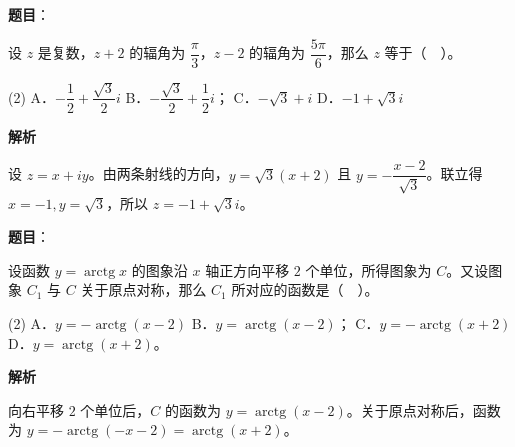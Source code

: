 \begin{answer}

\textbf{题目}：

设 $z$ 是复数，$z+2$ 的辐角为 $\dfrac\pi3$，$z-2$ 的辐角为 $\dfrac{5\pi}6$，那么 $z$ 等于（　）。

\begin{gkopts}(2)
\task A．$-\dfrac12+\dfrac{\sqrt3}2i$
\task B．$-\dfrac{\sqrt3}2+\dfrac12i$；
\task C．$-\sqrt3+i$
\task D．$-1+\sqrt3i$
\end{gkopts}

\textbf{解析}

设 $z=x+iy$。由两条射线的方向，$y=\sqrt3(x+2)$ 且 $y=-\dfrac{x-2}{\sqrt3}$。联立得 $x=-1,y=\sqrt3$，所以 $z=-1+\sqrt3i$。


\end{answer}
\begin{answer}

\textbf{题目}：

设函数 $y=\operatorname{arctg}x$ 的图象沿 $x$ 轴正方向平移 $2$ 个单位，所得图象为 $C$。又设图象 $C_1$ 与 $C$ 关于原点对称，那么 $C_1$ 所对应的函数是（　）。

\begin{gkopts}(2)
\task A．$y=-\operatorname{arctg}(x-2)$
\task B．$y=\operatorname{arctg}(x-2)$；
\task C．$y=-\operatorname{arctg}(x+2)$
\task D．$y=\operatorname{arctg}(x+2)$。
\end{gkopts}

\textbf{解析}

向右平移 $2$ 个单位后，$C$ 的函数为 $y=\operatorname{arctg}(x-2)$。关于原点对称后，函数为 $y=-\operatorname{arctg}(-x-2)=\operatorname{arctg}(x+2)$。


\end{answer}
